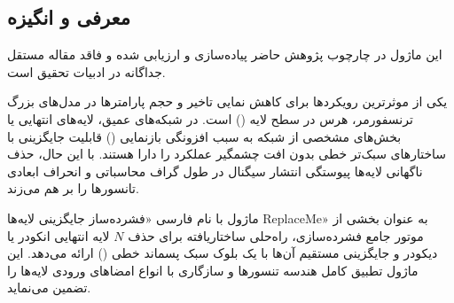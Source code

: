 \subsection{معرفی و انگیزه}
این ماژول در چارچوب پژوهش حاضر پیاده‌سازی و ارزیابی شده و فاقد مقاله مستقل جداگانه در ادبیات تحقیق است.

یکی از موثرترین رویکردها برای کاهش نمایی تاخیر و حجم پارامترها در مدل‌های بزرگ ترنسفورمر، هرس در سطح لایه () است. در شبکه‌های عمیق، لایه‌های انتهایی یا بخش‌های مشخصی از شبکه به سبب افزونگی بازنمایی () قابلیت جایگزینی با ساختارهای سبک‌تر خطی بدون افت چشمگیر عملکرد را دارا هستند. با این حال، حذف ناگهانی لایه‌ها پیوستگی انتشار سیگنال در طول گراف محاسباتی و انحراف ابعادی تانسورها را بر هم می‌زند.

ماژول  با نام فارسی «فشرده‌ساز جایگزینی لایه‌ها ReplaceMe» به عنوان بخشی از موتور جامع فشرده‌سازی، راه‌حلی ساختاریافته برای حذف $N$ لایه انتهایی انکودر یا دیکودر و جایگزینی مستقیم آن‌ها با یک بلوک سبک پسماند خطی () ارائه می‌دهد. این ماژول تطبیق کامل هندسه تنسورها و سازگاری با انواع امضاهای ورودی لایه‌ها را تضمین می‌نماید.
